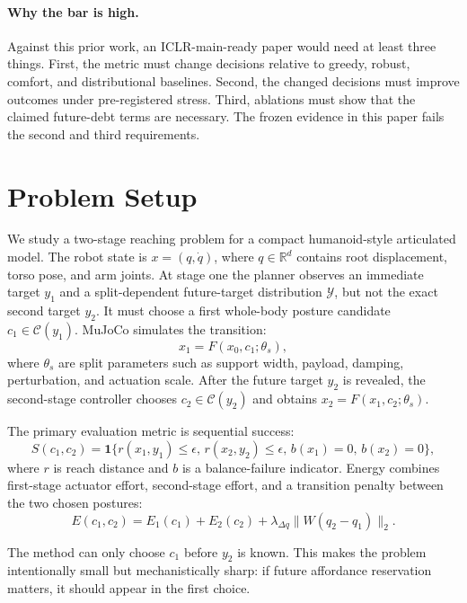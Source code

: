 \documentclass{article}
\newcommand{\candidateSet}{\mathcal{C}}
\newcommand{\futureSet}{\mathcal{Y}}
\newcommand{\state}{x}
\newcommand{\target}{y}
\newcommand{\Real}{\mathbb{R}}
\begin{document}
\paragraph{Why the bar is high.}
Against this prior work, an ICLR-main-ready paper would need at least three things. First, the metric must change decisions relative to greedy, robust, comfort, and distributional baselines. Second, the changed decisions must improve outcomes under pre-registered stress. Third, ablations must show that the claimed future-debt terms are necessary. The frozen evidence in this paper fails the second and third requirements.

\section{Problem Setup}

We study a two-stage reaching problem for a compact humanoid-style articulated model. The robot state is $\state=(q,\dot q)$, where $q\in\Real^d$ contains root displacement, torso pose, and arm joints. At stage one the planner observes an immediate target $\target_1$ and a split-dependent future-target distribution $\futureSet$, but not the exact second target $\target_2$. It must choose a first whole-body posture candidate $c_1\in\candidateSet(\target_1)$. MuJoCo simulates the transition:
\begin{equation}
  \state_1 = F(\state_0,c_1;\theta_s),
\end{equation}
where $\theta_s$ are split parameters such as support width, payload, damping, perturbation, and actuation scale. After the future target $\target_2$ is revealed, the second-stage controller chooses $c_2\in\candidateSet(\target_2)$ and obtains $\state_2=F(\state_1,c_2;\theta_s)$.

The primary evaluation metric is sequential success:
\begin{equation}
  S(c_1,c_2) =
  \mathbf{1}
  \{r(\state_1,\target_1)\leq \epsilon,\,
    r(\state_2,\target_2)\leq \epsilon,\,
    b(\state_1)=0,\,
    b(\state_2)=0\},
\end{equation}
where $r$ is reach distance and $b$ is a balance-failure indicator. Energy combines first-stage actuator effort, second-stage effort, and a transition penalty between the two chosen postures:
\begin{equation}
  E(c_1,c_2)=E_1(c_1)+E_2(c_2)+\lambda_{\Delta q}\|W(q_2-q_1)\|_2.
\end{equation}

The method can only choose $c_1$ before $\target_2$ is known. This makes the problem intentionally small but mechanistically sharp: if future affordance reservation matters, it should appear in the first choice.
\end{document}
